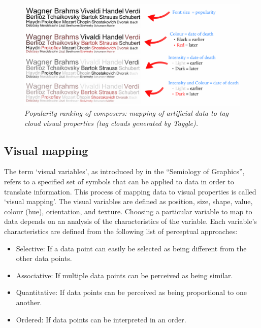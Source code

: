 \begin{figure}[!htb]
	\centering
	\includegraphics[scale=0.40]{mapping.png}
	\caption{\textit{Popularity ranking of composers: mapping of artificial data to tag cloud visual properties (tag clouds generated by Taggle).}}
	\label{fig:tagmapping}
\end{figure}

\subsection{Visual mapping} 

The term `visual variables', as introduced by \citet{bertin83} in the ``Semiology of Graphics'', refers to a specified set of symbols that can be applied to data in order to translate information. This process of mapping data to visual properties is called `visual mapping'. The visual variables are defined as position, size, shape, value, colour (hue), orientation, and texture. Choosing a particular variable to map to data depends on an analysis of the characteristics of the variable. Each variable's characteristics are defined from the following list of perceptual approaches:

\begin{itemize}
	\item Selective: If a data point can easily be selected as being different from the other data points.
	\item Associative: If multiple data points can be perceived as being similar.
 	\item Quantitative: If data points can be perceived as being proportional to one another.
 	\item Ordered: If data points can be interpreted in an order.
\end{itemize}


